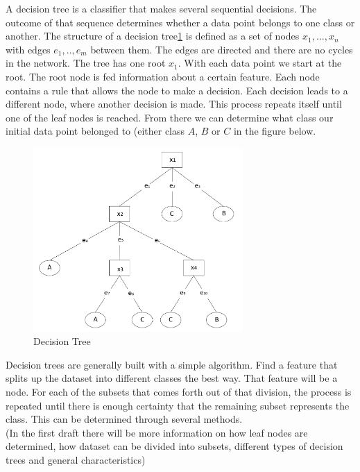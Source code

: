 \hspace{0.5cm} A decision tree is a classifier that makes several sequential decisions. The outcome of that sequence determines whether a data point belongs to one class or another. The structure of a decision tree\ref{fig:DT} is defined as a set of nodes ${x_1, ... , x_n}$ with edges ${e_1, .., e_{m}}$ between them. The edges are directed and there are no cycles in the network. The tree has one root $x_1$. With each data point we start at the root. The root node is fed information about a certain feature. Each node contains a rule that allows the node to make a decision. Each decision leads to a different node, where another decision is made. This process repeats itself until one of the leaf nodes is reached\cite{safavian1991survey}. From there we can determine what class our initial data point belonged to (either class $A$, $B$ or $C$ in the figure below. 
\begin{figure}[H]
    \includegraphics[width=80mm]{./img/decisiontree.png}
    \caption{Decision Tree}
    \label{fig:DT}
\end{figure}
Decision trees are generally built with a simple algorithm. Find a feature that splits up the dataset into different classes the best way. That feature will be a node. For each of the subsets that comes forth out of that division, the process is repeated until there is enough certainty that the remaining subset represents the class. This can be determined through several methods. \\
(In the first draft there will be more information on how leaf nodes are determined, how dataset can be divided into subsets, different types of decision trees and general characteristics)